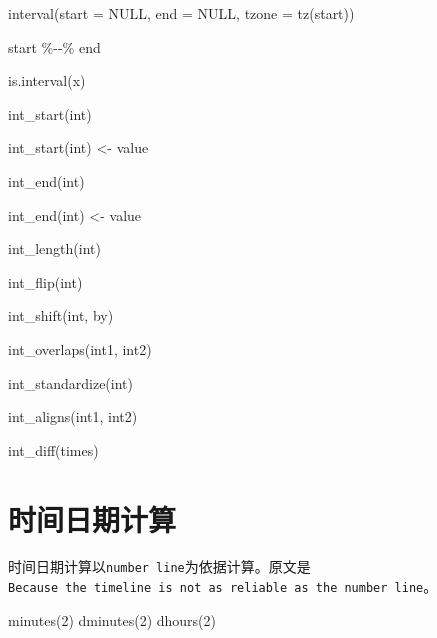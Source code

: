 \documentclass[
]{book}
\newenvironment{Shaded}{\begin{snugshade}}{\end{snugshade}}
\newcommand{\AttributeTok}[1]{\textcolor[rgb]{0.77,0.63,0.00}{#1}}
\newcommand{\ConstantTok}[1]{\textcolor[rgb]{0.00,0.00,0.00}{#1}}
\newcommand{\DecValTok}[1]{\textcolor[rgb]{0.00,0.00,0.81}{#1}}
\newcommand{\FunctionTok}[1]{\textcolor[rgb]{0.00,0.00,0.00}{#1}}
\newcommand{\NormalTok}[1]{#1}
\newcommand{\OtherTok}[1]{\textcolor[rgb]{0.56,0.35,0.01}{#1}}
\newcommand{\SpecialCharTok}[1]{\textcolor[rgb]{0.00,0.00,0.00}{#1}}
\begin{document}
\begin{Shaded}
\begin{Highlighting}[]
\FunctionTok{interval}\NormalTok{(}\AttributeTok{start =} \ConstantTok{NULL}\NormalTok{, }\AttributeTok{end =} \ConstantTok{NULL}\NormalTok{, }\AttributeTok{tzone =} \FunctionTok{tz}\NormalTok{(start))}

\NormalTok{start }\SpecialCharTok{\%{-}{-}\%}\NormalTok{ end}

\FunctionTok{is.interval}\NormalTok{(x)}

\FunctionTok{int\_start}\NormalTok{(int)}

\FunctionTok{int\_start}\NormalTok{(int) }\OtherTok{\textless{}{-}}\NormalTok{ value}

\FunctionTok{int\_end}\NormalTok{(int)}

\FunctionTok{int\_end}\NormalTok{(int) }\OtherTok{\textless{}{-}}\NormalTok{ value}

\FunctionTok{int\_length}\NormalTok{(int)}

\FunctionTok{int\_flip}\NormalTok{(int)}

\FunctionTok{int\_shift}\NormalTok{(int, by)}

\FunctionTok{int\_overlaps}\NormalTok{(int1, int2)}

\FunctionTok{int\_standardize}\NormalTok{(int)}

\FunctionTok{int\_aligns}\NormalTok{(int1, int2)}

\FunctionTok{int\_diff}\NormalTok{(times)}
\end{Highlighting}
\end{Shaded}

\hypertarget{ux65f6ux95f4ux65e5ux671fux8ba1ux7b97}{%
\section{时间日期计算}\label{ux65f6ux95f4ux65e5ux671fux8ba1ux7b97}}

时间日期计算以\texttt{number\ line}为依据计算。原文是\texttt{Because\ the\ timeline\ is\ not\ as\ reliable\ as\ the\ number\ line}。

\begin{Shaded}
\begin{Highlighting}[]
\FunctionTok{minutes}\NormalTok{(}\DecValTok{2}\NormalTok{)}
\FunctionTok{dminutes}\NormalTok{(}\DecValTok{2}\NormalTok{)}
\FunctionTok{dhours}\NormalTok{(}\DecValTok{2}\NormalTok{)}
\end{Highlighting}
\end{Shaded}
\end{document}
